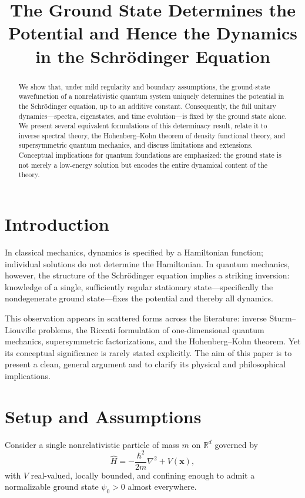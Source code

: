\documentclass[11pt]{article}
\title{The Ground State Determines the Potential and Hence the Dynamics in the Schr\"odinger Equation}
\author{}
\date{}
\begin{document}
\maketitle

\begin{abstract}
We show that, under mild regularity and boundary assumptions, the ground-state wavefunction of a nonrelativistic quantum system uniquely determines the potential in the Schr\"odinger equation, up to an additive constant. Consequently, the full unitary dynamics---spectra, eigenstates, and time evolution---is fixed by the ground state alone. We present several equivalent formulations of this determinacy result, relate it to inverse spectral theory, the Hohenberg--Kohn theorem of density functional theory, and supersymmetric quantum mechanics, and discuss limitations and extensions. Conceptual implications for quantum foundations are emphasized: the ground state is not merely a low-energy solution but encodes the entire dynamical content of the theory.
\end{abstract}

\section{Introduction}
In classical mechanics, dynamics is specified by a Hamiltonian function; individual solutions do not determine the Hamiltonian. In quantum mechanics, however, the structure of the Schr\"odinger equation implies a striking inversion: knowledge of a single, sufficiently regular stationary state---specifically the nondegenerate ground state---fixes the potential and thereby all dynamics.

This observation appears in scattered forms across the literature: inverse Sturm--Liouville problems, the Riccati formulation of one-dimensional quantum mechanics, supersymmetric factorizations, and the Hohenberg--Kohn theorem. Yet its conceptual significance is rarely stated explicitly. The aim of this paper is to present a clean, general argument and to clarify its physical and philosophical implications.

\section{Setup and Assumptions}
Consider a single nonrelativistic particle of mass $m$ on $\mathbb{R}^d$ governed by
\begin{equation}
\hat H = -\frac{\hbar^2}{2m}\nabla^2 + V(\mathbf{x}),
\end{equation}
with $V$ real-valued, locally bounded, and confining enough to admit a normalizable ground state $\psi_0>0$ almost everywhere.
\end{document}
